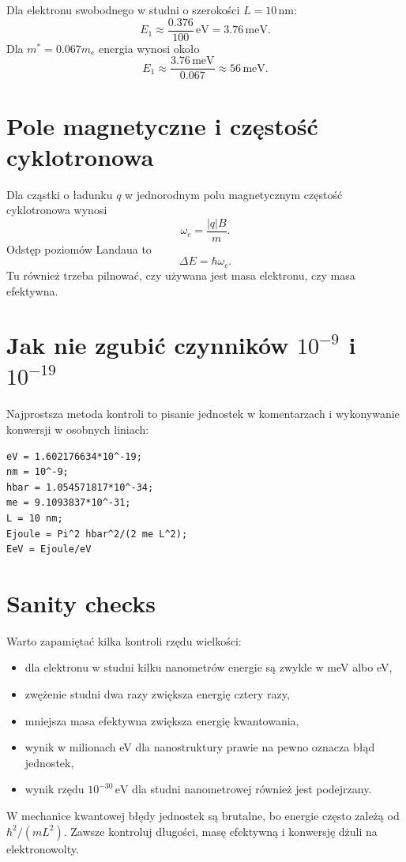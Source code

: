 \begin{examplebox}
Dla elektronu swobodnego w studni o szerokości \(L=10\,\mathrm{nm}\):
\begin{equation}
    E_1\approx\frac{0.376}{100}\,\mathrm{eV}=3.76\,\mathrm{meV}.
\end{equation}
Dla \(m^*=0.067m_e\) energia wynosi około
\begin{equation}
    E_1\approx\frac{3.76\,\mathrm{meV}}{0.067}\approx56\,\mathrm{meV}.
\end{equation}
\end{examplebox}

\section{Pole magnetyczne i częstość cyklotronowa}

Dla cząstki o ładunku \(q\) w jednorodnym polu magnetycznym częstość cyklotronowa
wynosi
\begin{equation}
    \omega_c=\frac{|q|B}{m}.
\end{equation}
Odstęp poziomów Landaua to
\begin{equation}
    \Delta E=\hbar\omega_c.
\end{equation}
Tu również trzeba pilnować, czy używana jest masa elektronu, czy masa efektywna.

\section{Jak nie zgubić czynników \texorpdfstring{\(10^{-9}\)}{10^-9} i \texorpdfstring{\(10^{-19}\)}{10^-19}}

Najprostsza metoda kontroli to pisanie jednostek w komentarzach i wykonywanie konwersji w osobnych liniach:
\begin{verbatim}
eV = 1.602176634*10^-19;
nm = 10^-9;
hbar = 1.054571817*10^-34;
me = 9.1093837*10^-31;
L = 10 nm;
Ejoule = Pi^2 hbar^2/(2 me L^2);
EeV = Ejoule/eV
\end{verbatim}

\section{Sanity checks}

Warto zapamiętać kilka kontroli rzędu wielkości:
\begin{itemize}
    \item dla elektronu w studni kilku nanometrów energie są zwykle w meV albo eV,
    \item zwężenie studni dwa razy zwiększa energię cztery razy,
    \item mniejsza masa efektywna zwiększa energię kwantowania,
    \item wynik w milionach eV dla nanostruktury prawie na pewno oznacza błąd jednostek,
    \item wynik rzędu \(10^{-30}\,\mathrm{eV}\) dla studni nanometrowej również jest podejrzany.
\end{itemize}

\begin{summarybox}
W mechanice kwantowej błędy jednostek są brutalne, bo energie często zależą od
\(\hbar^2/(mL^2)\). Zawsze kontroluj długości, masę efektywną i konwersję dżuli na
elektronowolty.
\end{summarybox}
